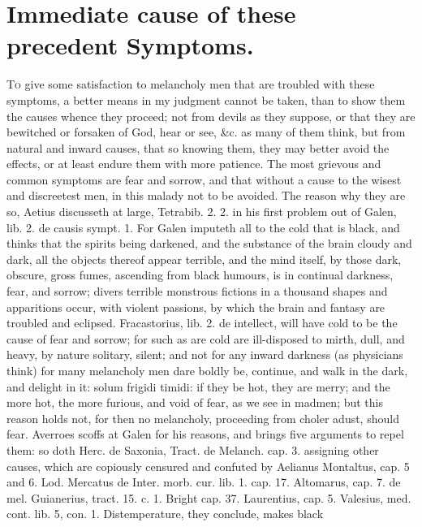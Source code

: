 {%

\section{Immediate cause of these precedent Symptoms.}

\lettrine{T}{o} give some satisfaction to melancholy men that are troubled with
these symptoms, a better means in my judgment cannot be taken, than to
show them the causes whence they proceed; not from devils as they
suppose, or that they are bewitched or forsaken of God, hear or see,
\&c. as many of them think, but from natural and inward causes, that so
knowing them, they may better avoid the effects, or at least endure
them with more patience. The most grievous and common symptoms are fear
and sorrow, and that without a cause to the wisest and discreetest men,
in this malady not to be avoided. The reason why they are so, Aetius
discusseth at large, Tetrabib. 2. 2. in his first problem out of Galen,
lib. 2. de causis sympt. 1. For Galen imputeth all to the cold that is
black, and thinks that the spirits being darkened, and the substance of
the brain cloudy and dark, all the objects thereof appear terrible, and
the mind itself, by those dark, obscure, gross fumes, ascending
from black humours, is in continual darkness, fear, and sorrow; divers
terrible monstrous fictions in a thousand shapes and apparitions occur,
with violent passions, by which the brain and fantasy are troubled and
eclipsed. Fracastorius, lib. 2. de intellect, will have cold to
be the cause of fear and sorrow; for such as are cold are ill-disposed
to mirth, dull, and heavy, by nature solitary, silent; and not for any
inward darkness (as physicians think) for many melancholy men dare
boldly be, continue, and walk in the dark, and delight in it: solum
frigidi timidi: if they be hot, they are merry; and the more hot, the
more furious, and void of fear, as we see in madmen; but this reason
holds not, for then no melancholy, proceeding from choler adust, should
fear. Averroes scoffs at Galen for his reasons, and brings five
arguments to repel them: so doth Herc. de Saxonia, Tract. de Melanch.
cap. 3. assigning other causes, which are copiously censured and
confuted by Aelianus Montaltus, cap. 5 and 6. Lod. Mercatus de Inter.
morb. cur. lib. 1. cap. 17. Altomarus, cap. 7. de mel. Guianerius,
tract. 15. c. 1. Bright cap. 37. Laurentius, cap. 5. Valesius, med.
cont. lib. 5, con. 1. Distemperature, they conclude, makes black
}
